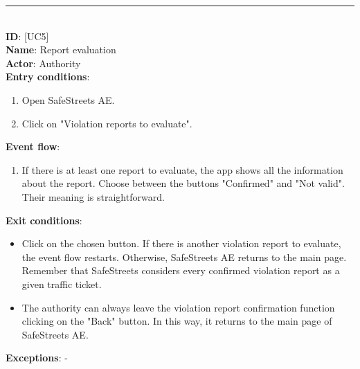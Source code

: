 \documentclass{article}
\newcommand\usecase[1]{ [UC#1] }
\begin{document}
				\rule{\linewidth}{0.4pt}
				\\
				
				\textbf{ID}: \usecase{5} \\
				\textbf{Name}: Report evaluation\\
				\textbf{Actor}: Authority\\
				\textbf{Entry conditions}:
				\begin{enumerate}
					\item Open SafeStreets AE.
					\item Click on "Violation reports to evaluate".
				\end{enumerate}
				\textbf{Event flow}:
				\begin{enumerate}
					\item If there is at least one report to evaluate, the app shows all the information about the report. Choose between the buttons "Confirmed" and "Not valid". Their meaning is straightforward.
				\end{enumerate}
				\textbf{Exit conditions}:
				\begin{itemize}
					\item Click on the chosen button. If there is another violation report to evaluate, the event flow restarts. Otherwise, SafeStreets AE returns to the main page. Remember that SafeStreets considers every confirmed violation report as a given traffic ticket.
					\item The authority can always leave the violation report confirmation function clicking on the "Back" button. In this way, it returns to the main page of SafeStreets AE.
				\end{itemize}
				\textbf{Exceptions}: -\\
				
			\clearpage
\end{document}
